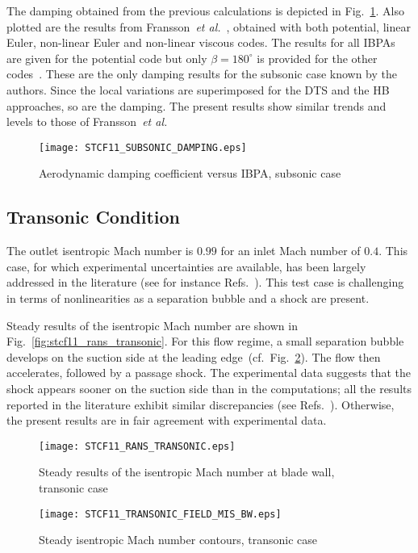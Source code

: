 The damping obtained from the previous calculations is depicted 
in Fig.~\ref{fig:stcf11_subsonic_damping}.  Also plotted are the results
from Fransson~\emph{et al.}~\cite{Fransson:1999uq}, obtained with both
potential, linear Euler, non-linear Euler and non-linear viscous codes.
The results for all IBPAs are given for the potential code but only $\beta=180^\circ$ is provided for the other codes~\cite{Fransson:1999uq}.
These are the only damping results for the
subsonic case known by the authors.  Since the local variations are
superimposed for the DTS and the HB approaches, so are the damping.
The present
results show similar trends and levels to those of Fransson~\emph{et al.} 
\begin{figure}[htb]
  \centering
  \texttt{[image: STCF11\_SUBSONIC\_DAMPING.eps]}
  \caption{Aerodynamic damping coefficient versus IBPA, subsonic case}
  \label{fig:stcf11_subsonic_damping}
\end{figure}



\subsection{Transonic Condition}
The outlet isentropic Mach number is $0.99$ for an inlet Mach number of $0.4$. 
This case, for which experimental uncertainties are available, 
has been largely addressed in the literature 
(see for instance Refs.~\cite{Sbardella:2001fk,Duta:2002uq,Campobasso:2003fk,Cinnella2004}). 
This test case is challenging in terms of nonlinearities as a separation bubble and a shock are present.

Steady results of the isentropic Mach number are shown in
Fig.~\ref{fig:stcf11_rans_transonic}.  For this flow regime,
a small separation
bubble develops on the suction side at the leading edge~(cf.~Fig.~\ref{fig:stcf11_transonic_field_mis_bw}).  The flow then accelerates, followed by a passage shock.  
The experimental data suggests that the shock appears
sooner on the suction side than in the computations; all the results 
reported in the literature exhibit similar discrepancies (see
Refs.~\cite{Fransson:1999uq,Sbardella:2001fk,Duta:2002uq,Campobasso:2003fk,Cinnella2004}). 
Otherwise, the present results are in fair agreement with experimental data.
\begin{figure}[htb]
  \centering
  \begin{minipage}[b]{.46\linewidth}
    \centering
    \texttt{[image: STCF11\_RANS\_TRANSONIC.eps]}
    \caption{Steady results of the isentropic Mach number at blade
      wall, transonic case}
    \label{fig:stcf11_rans_transonic}
  \end{minipage}\quad
  \begin{minipage}[b]{.46\linewidth}
    \centering
    \texttt{[image: STCF11\_TRANSONIC\_FIELD\_MIS\_BW.eps]}
    \caption{Steady isentropic Mach number contours, transonic case}
    \label{fig:stcf11_transonic_field_mis_bw}
  \end{minipage}
\end{figure}

